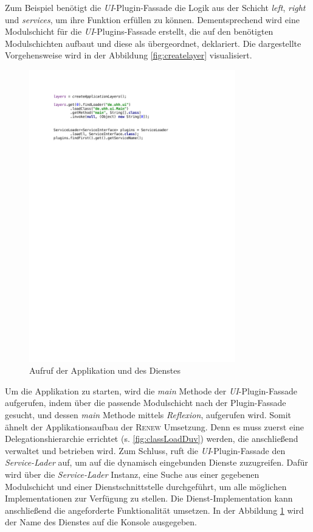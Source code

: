 	Zum Beispiel benötigt die \textit{UI}-Plugin-Fassade die Logik aus der Schicht \textit{left}, \textit{right} und \textit{services}, um ihre Funktion erfüllen zu können. Dementsprechend wird eine Modulschicht für die \textit{UI}-Plugins-Fassade erstellt, die auf den benötigten Modulschichten aufbaut und diese als übergeordnet, deklariert. Die dargestellte Vorgehensweise wird in der Abbildung \ref{fig:createlayer} visualisiert.\newpage
	\begin{figure}[h!]
		   \centering
		   \captionsetup{justification=centering}
		   \includegraphics[width=0.8\textwidth]{material/images/umsetzung/main.pdf}
		    \caption{Aufruf der Applikation und des Dienstes}
		   \label{fig:figgi}
	\end{figure}
	Um die Applikation zu starten, wird die \textit{main} Methode der \textit{UI}-Plugin-Fassade aufgerufen, indem über die passende Modulschicht nach der Plugin-Fassade gesucht, und dessen \textit{main} Methode mittels \textit{Reflexion}, aufgerufen wird. Somit ähnelt der Applikationsaufbau der \textsc{Renew} Umsetzung. Denn es muss zuerst eine Delegationshierarchie errichtet (s. \ref{fig:classLoadDuv}) werden, die anschließend verwaltet und betrieben wird. \newline
	Zum Schluss, ruft die \textit{UI}-Plugin-Fassade den \textit{Service-Lader} auf, um auf die dynamisch eingebunden Dienste zuzugreifen. Dafür wird über die \textit{Service-Lader} Instanz, eine Suche aus einer gegebenen Modulschicht und einer Dienstschnittstelle durchgeführt, um alle möglichen Implementationen zur Verfügung zu stellen. Die Dienst-Implementation kann anschließend die angeforderte Funktionalität umsetzen. In der Abbildung \ref{fig:figgi} wird der Name des Dienstes auf die Konsole ausgegeben. \bigbreak 

